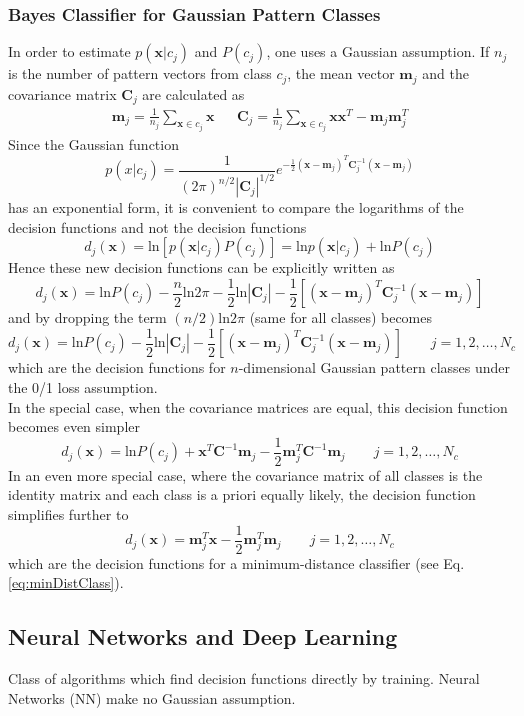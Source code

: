 \subsubsection{Bayes Classifier for Gaussian Pattern Classes}
In order to estimate $p(\mathbf{x}|c_j)$ and $P(c_j)$, one uses a Gaussian assumption.
If $n_j$ is the number of pattern vectors from class $c_j$, the mean vector $\mathbf{m}_j$ and the covariance matrix $\mathbf{C}_j$ are calculated as
\begin{align*}
	\mathbf{m}_j = \frac{1}{n_j} \sum\limits_{\mathbf{x}\in c_j} \mathbf{x}
	&&
	\mathbf{C}_j = \frac{1}{n_j} \sum\limits_{\mathbf{x}\in c_j} \mathbf{x}\mathbf{x}^T - \mathbf{m}_j\mathbf{m}_j^T
\end{align*}
Since the Gaussian function
\[
  p(x|c_j) = \frac{1}{(2\pi)^{n/2} |\mathbf{C}_j|^{1/2}} e^{-\frac{1}{2}(\mathbf{x} - \mathbf{m}_j)^T \mathbf{C}_j^{-1} (\mathbf{x} - \mathbf{m}_j)}
\]
has an exponential form, it is convenient to compare the logarithms of the decision functions and not the decision functions
\[
  d_j(\mathbf{x}) = \text{ln}[p(\mathbf{x}|c_j) P(c_j)] = \text{ln}p(\mathbf{x}|c_j) + \text{ln}P(c_j)
\]
Hence these new decision functions can be explicitly written as
\[
  d_j(\mathbf{x}) = \text{ln}P(c_j) - \frac{n}{2}\text{ln}2\pi - \frac{1}{2}\text{ln}|\mathbf{C}_j| - \frac{1}{2}[(\mathbf{x} - \mathbf{m}_j)^T \mathbf{C}_j^{-1} (\mathbf{x} - \mathbf{m}_j)]
\]
and by dropping the term $(n/2)\text{ln}2\pi$ (same for all classes) becomes
\[
  d_j(\mathbf{x}) = \text{ln}P(c_j) - \frac{1}{2}\text{ln}|\mathbf{C}_j| - \frac{1}{2}[(\mathbf{x} - \mathbf{m}_j)^T \mathbf{C}_j^{-1} (\mathbf{x} - \mathbf{m}_j)] \qquad j = 1,2,\ldots,N_c
\]
which are the decision functions for $n$-dimensional Gaussian pattern classes under the 0/1 loss assumption.\\
In the special case, when the covariance matrices are equal, this decision function becomes even simpler
\[
  d_j(\mathbf{x}) = \text{ln}P(c_j) + \mathbf{x}^T \mathbf{C}^{-1} \mathbf{m}_j - \frac{1}{2}\mathbf{m}_j^T\mathbf{C}^{-1}\mathbf{m}_j \qquad j = 1,2,\ldots,N_c
\]
In an even more special case, where the covariance matrix of all classes is the identity matrix and each class is a priori equally likely, the decision function simplifies further to
\[
  d_j(\mathbf{x}) = \mathbf{m}_j^T \mathbf{x} - \frac{1}{2}\mathbf{m}_j^{T}\mathbf{m}_j \qquad j = 1,2,\ldots,N_c
\]
which are the decision functions for a minimum-distance classifier (see Eq. \ref{eq:minDistClass}).


\subsection{Neural Networks and Deep Learning}
Class of algorithms which find decision functions directly by training. Neural Networks (NN) make no Gaussian assumption.

